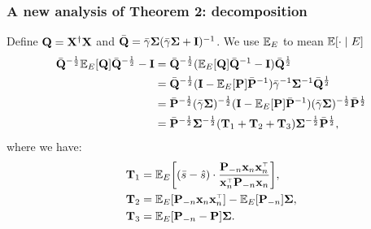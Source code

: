 \documentclass[10pt]{beamer}
\begin{document}
 
 \begin{frame}
   \frametitle{A new analysis of Theorem 2: decomposition}
   Define $\mathbf Q = \mathbf X^\dagger \mathbf X$ and
   $\bar{\mathbf Q}=\bar\gamma\mathbf{\Sigma}(\bar\gamma\mathbf{\Sigma}+\mathbf I)^{-1}$. We use
   $\mathbb E_E$ to mean $\mathbb E[\cdot\mid E]$
   \begin{align*}
     \bar{\mathbf Q}^{-\frac12}\mathbb E_E[\mathbf Q]\bar{\mathbf Q}^{-\frac12} - \mathbf I
     &=\bar{\mathbf Q}^{-\frac12}(\mathbb E_E[\mathbf Q]\bar{\mathbf Q}^{-1} - \mathbf I)\bar{\mathbf Q}^{\frac12}
     \\
     &=\bar{\mathbf Q}^{-\frac12}(\mathbf I-\mathbb E_E[\mathbf P]\bar{\mathbf P}^{-1})\bar\gamma^{-1}\mathbf{\Sigma}^{-1}\bar{\mathbf Q}^{\frac12}
     \\
     &=\bar{\mathbf P}^{-\frac12}(\bar\gamma\mathbf{\Sigma})^{-\frac12}(\mathbf I-\mathbb E_E[\mathbf P]\bar{\mathbf P}^{-1})(\bar\gamma\mathbf{\Sigma})^{-\frac12}\bar{\mathbf P}^{\frac12}
     \\
     &=\bar{\mathbf P}^{-\frac12}\mathbf{\Sigma}^{-\frac12}
       (\mathbf{T}_1 + \mathbf{T}_2 + \mathbf{T}_3) \mathbf{\Sigma}^{-\frac12}\bar{\mathbf P}^{\frac12},
   \end{align*}
   where we have:
   \begin{align*}
     \T_1
     &= \E_E\bigg[(\bar s - \hat s)\cdot
            \frac{\P_{-n}\x_n\x_n^\top}{\x_n^\top\P_{-n}\x_n}\bigg],
     \\
     \T_2 
     &=\E_E[\P_{-n}\x_n\x_n^\top] - \E_E[\P_{-n}]\Sigmab,
     \\
     \T_3
     &=\E_E[\P_{-n} - \P]\Sigmab.
   \end{align*}
 \end{frame}
\end{document}
